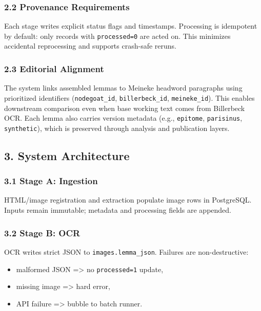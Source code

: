 \documentclass[
]{article}
\providecommand{\tightlist}{%
  \setlength{\itemsep}{0pt}\setlength{\parskip}{0pt}}
\begin{document}
\hypertarget{22-provenance-requirements}{%
\subsubsection{2.2 Provenance
Requirements}\label{22-provenance-requirements}}

Each stage writes explicit status flags and timestamps. Processing is
idempotent by default: only records with \texttt{processed=0} are acted
on. This minimizes accidental reprocessing and supports crash-safe
reruns.

\hypertarget{23-editorial-alignment}{%
\subsubsection{2.3 Editorial Alignment}\label{23-editorial-alignment}}

The system links assembled lemmas to Meineke headword paragraphs using
prioritized identifiers (\texttt{nodegoat\_id}, \texttt{billerbeck\_id},
\texttt{meineke\_id}). This enables downstream comparison even when base
working text comes from Billerbeck OCR. Each lemma also carries version
metadata (e.g., \texttt{epitome}, \texttt{parisinus},
\texttt{synthetic}), which is preserved through analysis and publication
layers.

\hypertarget{3-system-architecture}{%
\subsection{3. System Architecture}\label{3-system-architecture}}

\hypertarget{31-stage-a-ingestion}{%
\subsubsection{3.1 Stage A: Ingestion}\label{31-stage-a-ingestion}}

HTML/image registration and extraction populate image rows in
PostgreSQL. Inputs remain immutable; metadata and processing fields are
appended.

\hypertarget{32-stage-b-ocr}{%
\subsubsection{3.2 Stage B: OCR}\label{32-stage-b-ocr}}

OCR writes strict JSON to \texttt{images.lemma\_json}. Failures are
non-destructive:

\begin{itemize}
\tightlist
\item
  malformed JSON =\textgreater{} no \texttt{processed=1} update,
\item
  missing image =\textgreater{} hard error,
\item
  API failure =\textgreater{} bubble to batch runner.
\end{itemize}
\end{document}
